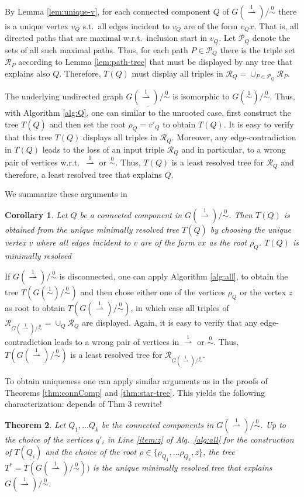 \documentclass[smallextended]{svjour3}
\newcommand{\rev}[1]{\begingroup\color{blue}#1\endgroup}
\newcommand{\TODO}[1]{\begingroup\color{red}#1\endgroup}
\newcommand{\Ro}{\mathrel{\overset{0}{\sim}}}
\newcommand{\Rl}{\mathrel{\overset{1}{\sim}}}
\newcommand{\Rld}{\mathrel{\overset{1}{\rightharpoonup}}}
\newtheorem{thm}{Theorem}
\newtheorem{cor}[thm]{Corollary}
\begin{document}
By Lemma \ref{lem:unique-v}, for each connected component $Q$ of
$G(\Rld)/\Ro$ there is a unique vertex $v_Q$ s.t.\ all edges incident to
$v_Q$ are of the form $v_Qx$. That is, all directed paths that are maximal
w.r.t.\ inclusion start in $v_Q$.  Let $\mathcal P_Q$ denote the sets of
all such maximal paths.  Thus, for each path $P \in \mathcal P_Q$
there is the triple set $\mathcal{R}_{P}$ according to Lemma
\ref{lem:path-tree} that must be displayed by any tree that explains also
$Q$.  Therefore, $T(Q)$ must display all triples in $\mathcal{R}_Q =
\cup_{P\in \mathcal{P}_Q} \mathcal{R}_{P}$.

The underlying undirected graph $\underline{G(\Rld)/\Ro}$ is isomorphic to
$G(\Rl)/\Ro$. Thus, with Algorithm \ref{alg:Q}, one can similar to the
unrooted case, first construct the tree $T(\underline{Q})$ and then set the
root $\rho_Q=v'_Q$ to obtain $T(Q)$.  It is easy to verify that this tree
$T(Q)$ displays all triples in $\mathcal{R}_Q$.  Moreover, any
edge-contradiction in $T(Q)$ leads to the loss of an input triple
$\mathcal{R}_Q$ and in particular, to a wrong pair of vertices w.r.t.\
$\Rld$ or $\Ro$.  Thus, $T(Q)$ is a least resolved tree for
$\mathcal{R}_Q$ and therefore, a least resolved tree that explains $Q$.

We summarize these arguments in
\begin{cor} 
  Let $Q$ be a connected component in $G(\Rld)/\Ro$. Then $T(Q)$ is
  obtained from the unique \rev{minimally} resolved tree $T(\underline{Q})$ by
  choosing the unique vertex $v$ where all edges incident to $v$ are of the
  form $vx$ as the root $\rho_Q$. \TODO{$T(Q)$ is minimally resolved}
\label{cor:Q-root}
\end{cor}

If $G(\Rld)/\Ro$ is disconnected, one can apply Algorithm \ref{alg:all}, to
obtain the tree $T(G(\Rl)/\Ro)$ and then chose either one of the vertices
$\rho_Q$ or the vertex $z$ as root to obtain $T(G(\Rld)/\Ro)$, in which
case all triples of $\mathcal{R}_{G(\Rld)/\Ro} = \cup_Q \mathcal R_Q$ are
displayed. Again, it is easy to verify that any edge-contradiction leads to
a wrong pair of vertices in $\Rld$ or $\Ro$. Thus, $T(G(\Rld)/\Ro)$ is a
least resolved tree for $\mathcal{R}_{G(\Rld)/\Ro}$.

To obtain uniqueness one can apply similar arguments as in the proofs of
Theorems \ref{thm:connComp} and \ref{thm:star-tree}. This yields the
following characterization: \TODO{depends of Thm 3 rewrite!} 

\begin{thm}
  Let $Q_1,\dots Q_k$ be the connected components in $G(\Rld)/\Ro$.  Up to
  the choice of the vertices $q'_i$ in Line \ref{item:z} of Alg.\
  \ref{alg:all} for the construction of $T(\underline{Q_i})$ and the choice
  of the root $\rho\in \{\rho_{Q_1},\ldots \rho_{Q_k}, z\}$, the tree $T^*
  = T(G(\Rld)/\Ro))$ is the unique \rev{minimally} resolved tree that explains
  $G(\Rld)/\Ro$.
  \label{thm:star-tree-dir}
\end{thm}
\end{document}
